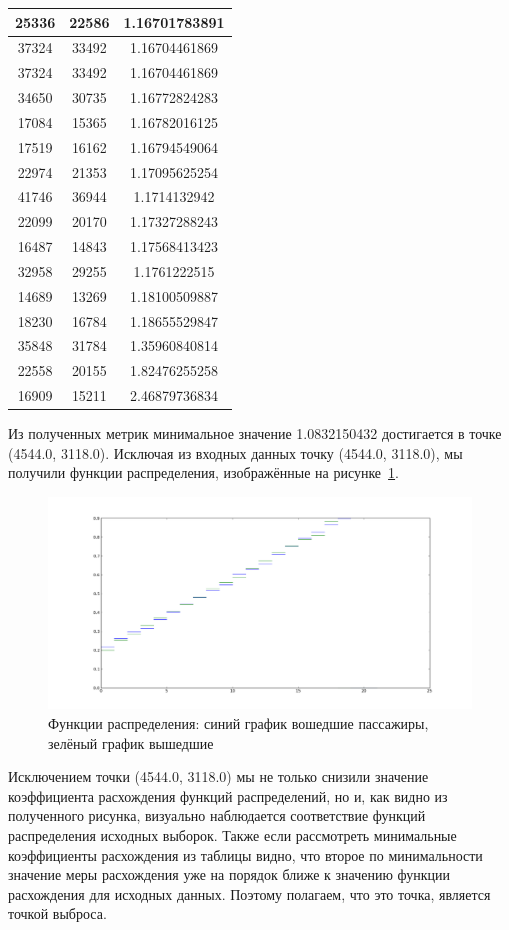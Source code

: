 \documentclass[12pt,a4paper,oneside]{extarticle}
\begin{document}
\begin{table}[ht!]
\begin{tabular}{|c|c|c|}
        25336 & 22586 & 1.16701783891 \\ \hline 
        37324 & 33492 & 1.16704461869 \\ \hline 
        37324 & 33492 & 1.16704461869 \\ \hline 
        34650 & 30735 & 1.16772824283 \\ \hline 
        17084 & 15365 & 1.16782016125 \\ \hline 
        17519 & 16162 & 1.16794549064 \\ \hline 
        22974 & 21353 & 1.17095625254 \\ \hline 
        41746 & 36944 & 1.1714132942 \\ \hline 
        22099 & 20170 & 1.17327288243 \\ \hline 
        16487 & 14843 & 1.17568413423 \\ \hline 
        32958 & 29255 & 1.1761222515 \\ \hline 
        14689 & 13269 & 1.18100509887 \\ \hline 
        18230 & 16784 & 1.18655529847 \\ \hline 
        35848 & 31784 & 1.35960840814 \\ \hline 
        22558 & 20155 & 1.82476255258 \\ \hline 
        16909 & 15211 & 2.46879736834 \\ \hline 

        \end{tabular}
    \end{table}

    Из полученных метрик минимальное значение 1.0832150432 достигается в точке (4544.0, 3118.0).
    Исключая из входных данных точку (4544.0, 3118.0), мы получили функции распределения, изображённые на рисунке~\ref{pic:case2}.
    \begin{figure}[ht!]
        \center
        \includegraphics[scale=0.45]{figure_2.png}
        \caption{Функции распределения: синий график вошедшие пассажиры, зелёный график вышедшие}
        \label{pic:case2}
    \end{figure}

    Исключением точки (4544.0, 3118.0) мы не только снизили значение коэффициента расхождения функций распределений, но и, как видно из полученного рисунка, визуально наблюдается соответствие функций распределения исходных выборок. Также если рассмотреть минимальные коэффициенты расхождения из таблицы видно, что второе по минимальности значение меры расхождения уже на порядок ближе к значению функции расхождения для исходных данных. Поэтому полагаем, что это точка, является точкой выброса.
\end{document}
